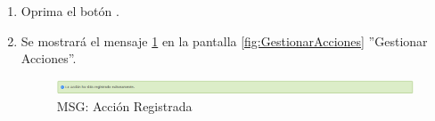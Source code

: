 \begin{enumerate}
			\item Oprima el botón \IUAceptar.
			
			\item Se mostrará el mensaje \ref{fig:accionRegistrada} en la pantalla \ref{fig:GestionarAcciones} ''Gestionar Acciones''.
			
			\begin{figure}[htbp!]
				\begin{center}
					\includegraphics[scale=0.5]{roles/lider/pantallas/acciones/pantallas/IU11-1-1-1MSG1}
					\caption{MSG: Acción Registrada}
					\label{fig:accionRegistrada}
				\end{center}
			\end{figure}
			\end{enumerate}